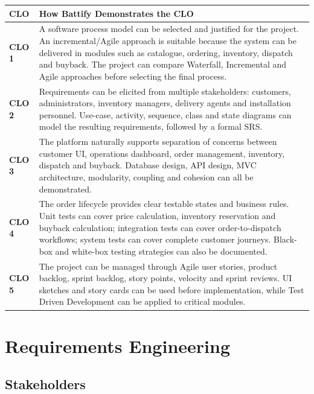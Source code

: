 \documentclass[11pt,a4paper]{article}
\begin{document}
\begin{longtable}{p{}p{}}
\toprule
\textbf{CLO} & \textbf{How Battify Demonstrates the CLO} \\
\midrule
\textbf{CLO 1} &
A software process model can be selected and justified for the project.
An incremental/Agile approach is suitable because the system can be delivered
in modules such as catalogue, ordering, inventory, dispatch and buyback.
The project can compare Waterfall, Incremental and Agile approaches before
selecting the final process. \\

\textbf{CLO 2} &
Requirements can be elicited from multiple stakeholders: customers,
administrators, inventory managers, delivery agents and installation
personnel. Use-case, activity, sequence, class and state diagrams can model
the resulting requirements, followed by a formal SRS. \\

\textbf{CLO 3} &
The platform naturally supports separation of concerns between customer UI,
operations dashboard, order management, inventory, dispatch and buyback.
Database design, API design, MVC architecture, modularity, coupling and
cohesion can all be demonstrated. \\

\textbf{CLO 4} &
The order lifecycle provides clear testable states and business rules.
Unit tests can cover price calculation, inventory reservation and buyback
calculation; integration tests can cover order-to-dispatch workflows; system
tests can cover complete customer journeys. Black-box and white-box testing
strategies can also be documented. \\

\textbf{CLO 5} &
The project can be managed through Agile user stories, product backlog,
sprint backlog, story points, velocity and sprint reviews. UI sketches and
story cards can be used before implementation, while Test Driven Development
can be applied to critical modules. \\

\bottomrule
\end{longtable}

\section{Requirements Engineering}

\subsection{Stakeholders}
\end{document}
